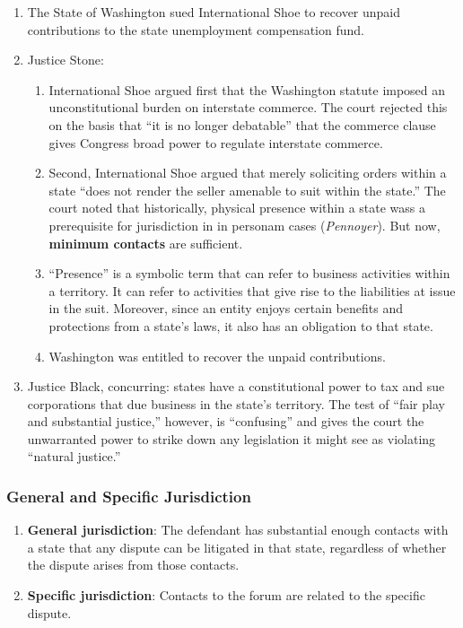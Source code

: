 \begin{enumerate}
    \item The State of Washington sued International Shoe to recover unpaid 
    contributions to the state unemployment compensation fund.
    \item Justice Stone:
    \begin{enumerate}
        \item International Shoe argued first that the Washington statute 
        imposed an unconstitutional burden on interstate commerce. The court 
        rejected this on the basis that ``it is no longer debatable'' that the 
        commerce clause gives Congress broad power to regulate interstate 
        commerce.
        \item Second, International Shoe argued that merely soliciting orders 
        within a state ``does not render the seller amenable to suit within 
        the state.'' The court noted that historically, physical presence 
        within a state wass a prerequisite for jurisdiction in in personam 
        cases (\emph{Pennoyer}). But now, \textbf{minimum contacts} are 
        sufficient.
        \item ``Presence'' is a symbolic term that can refer to business 
        activities within a territory.  It can refer to activities that give 
        rise to the liabilities at issue in the suit. Moreover, since an 
        entity enjoys certain benefits and protections from a state's laws, it 
        also has an obligation to that state.
        \item Washington was entitled to recover the unpaid contributions.
    \end{enumerate}
    \item Justice Black, concurring: states have a constitutional power to tax 
    and sue corporations that due business in the state's territory. The test 
    of ``fair play and substantial justice,'' however, is ``confusing'' and 
    gives the court the unwarranted power to strike down any legislation it 
    might see as violating ``natural justice.''
\end{enumerate}

\subsubsection{General and Specific Jurisdiction}

\begin{enumerate}
    \item \textbf{General jurisdiction}: The defendant has substantial enough 
    contacts with a state that any dispute can be litigated in that state, 
    regardless of whether the dispute arises from those contacts.
    \item \textbf{Specific jurisdiction}: Contacts to the forum are related to 
    the specific dispute.
\end{enumerate}

